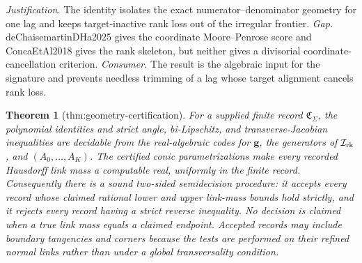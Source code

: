 \documentclass{article}
\newtheorem{theorem}{Theorem}
\begin{document}
\par\smallskip\noindent \textit{Justification.} The identity isolates the exact numerator--denominator geometry for one lag and keeps target-inactive rank loss out of the irregular frontier. \textit{Gap.} deChaisemartinDHa2025 gives the coordinate Moore--Penrose score and ConcaEtAl2018 gives the rank skeleton, but neither gives a divisorial coordinate-cancellation criterion. \textit{Consumer.} The result is the algebraic input for the signature and prevents needless trimming of a lag whose target alignment cancels rank loss.

\begin{theorem}[thm:geometry-certification]\label{thm:geometry-certification}
For a supplied finite record \(\mathfrak C_\Sigma\), the polynomial identities and strict angle, bi-Lipschitz, and transverse-Jacobian inequalities are decidable from the real-algebraic codes for \(\mathbf g\), the generators of \(\mathcal I_{\rm rk}\), and \((A_0,\ldots,A_K)\). The certified conic parametrizations make every recorded Hausdorff link mass a computable real, uniformly in the finite record. Consequently there is a sound two-sided semidecision procedure: it accepts every record whose claimed rational lower and upper link-mass bounds hold strictly, and it rejects every record having a strict reverse inequality. No decision is claimed when a true link mass equals a claimed endpoint. Accepted records may include boundary tangencies and corners because the tests are performed on their refined normal links rather than under a global transversality condition.
\end{theorem}
\end{document}
